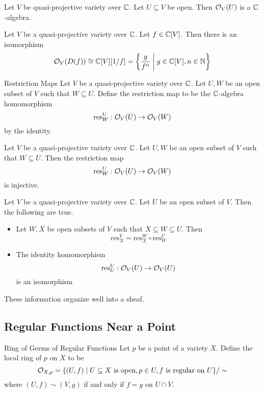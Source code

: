 \documentclass[a4paper]{article}
\begin{document}
\begin{lmm}{}{} Let $V$ be quasi-projective variety over $\mathbb{C}$. Let $U\subseteq V$ be open. Then $\mathcal{O}_V(U)$ is a $\mathbb{C}$-algebra. 
\end{lmm}

\begin{prp}{}{} Let $V$ be a quasi-projective variety over $\mathbb{C}$. Let $f\in\mathbb{C}[V]$. Then there is an isomorphism $$\mathcal{O}_V(D(f))\cong\mathbb{C}[V][1/f]=\left\{\frac{g}{f^n}\;\bigg{|}\;g\in\mathbb{C}[V],n\in\mathbb{N}\right\}$$
\end{prp}

\begin{defn}{Restriction Maps}{} Let $V$ be a quasi-projective variety over $\mathbb{C}$. Let $U,W$ be an open subset of $V$ such that $W\subseteq U$. Define the restriction map to be the $\mathbb{C}$-algebra homomorphism $$\text{res}_W^U:\mathcal{O}_V(U)\to\mathcal{O}_V(W)$$ by the identity. 
\end{defn}

\begin{prp}{}{} Let $V$ be a quasi-projective variety over $\mathbb{C}$. Let $U,W$ be an open subset of $V$ such that $W\subseteq U$. Then the restriction map $$\text{res}_W^U:\mathcal{O}_V(U)\to\mathcal{O}_V(W)$$ is injective. 
\end{prp}

\begin{prp}{}{} Let $V$ be a quasi-projective variety over $\mathbb{C}$. Let $U$ be an open subset of $V$. Then the following are true. 
\begin{itemize}
\item Let $W,X$ be open subsets of $V$ such that $X\subseteq W\subseteq U$. Then $$\text{res}_X^V=\text{res}_X^W\circ\text{res}_W^U$$
\item The identity homomorphism $$\text{res}_U^U:\mathcal{O}_V(U)\to\mathcal{O}_V(U)$$ is an isomorphism
\end{itemize}
\end{prp}

These information organize well into a sheaf. 

\subsection{Regular Functions Near a Point}
\begin{defn}{Ring of Germs of Regular Functions}{} Let $p$ be a point of a variety $X$. Define the local ring of $p$ on $X$ to be $$\mathcal{O}_{X,p}=\{(U,f)\;|\;U\subseteq X\text{ is open}, p\in U, f\text{ is regular on }U\}/\sim$$ where $(U,f)\sim(V,g)$ if and only if $f=g$ on $U\cap V$. 
\end{defn}
\end{document}
